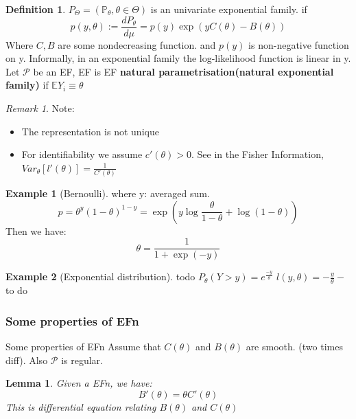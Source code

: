 \documentclass[a4paper,12pt, oneside, fleqn]{book}
\newtheorem{lemma}[theorem]{Lemma}
\theoremstyle{definition}
\newtheorem{definition}{Definition}[section]
\newtheorem*{example}{Example}
\theoremstyle{remark}
\newtheorem*{remark}{Remark}
\begin{document}
\begin{definition}
	$P_\Theta = (\mathbb{P}_\theta, \theta \in \Theta)$ is an univariate exponential family. if 
	\begin{equation*}
		p(y,\theta) := \frac{dP_\theta}{d\mu} = p(y) \exp (y C(\theta) - B(\theta))
	\end{equation*}
	Where $C, B$ are some nondecreasing function. and $p(y)$ is non-negative function on y. Informally, in an exponential family the log-likelihood function is linear in y. Let $\mathcal{P}$ be an EF, EF is EF \textbf{natural parametrisation(natural exponential family)} if $\mathbb{E} Y_i \equiv \theta$
\end{definition}


\begin{remark}
	Note:
	\begin{itemize}
		\item The representation is not unique
		\item For identifiability we assume $c'(\theta) >0$. See in the Fisher Information, $Var_\theta[l'(\theta)] = \frac{1}{C'(\theta)}$
	\end{itemize}
\end{remark}

\begin{example}[Bernoulli]
where y: averaged sum.
\begin{equation*}
	p = \theta^y (1-\theta)^{1 -y} =\exp\left( y \log \frac{\theta}{1 - \theta} + \log (1 - \theta)\right)
\end{equation*}
Then we have:
\begin{equation*}
	\theta = \frac{1}{1 + \exp(-y)}
\end{equation*}
\end{example}

\begin{example}[Exponential distribution]
	todo	
	$P_\theta( Y > y) = e^{\frac{-y}{\theta}}$
	$l(y, \theta) = -\frac{y}{\theta} - $ to do
\end{example}

\subsubsection*{Some properties of EFn}
Some properties of EFn
Assume that $C(\theta)$ and $B(\theta)$ are smooth. (two times diff). Also $\mathcal{P}$ is regular.

\begin{lemma}
	Given a EFn, we have:
	\begin{equation} \label{ODE}
		B'(\theta) = \theta C'(\theta)
	\end{equation}
	This is differential equation relating $B(\theta)$ and $C(\theta)$
\end{lemma}
\end{document}
